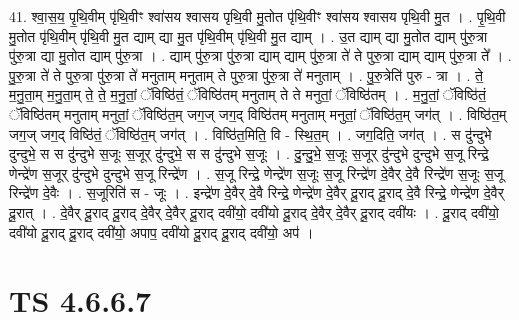 \documentclass[17pt]{extarticle}
\begin{document}
41. श्वा॒स॒य॒ पृ॒थि॒वीम् पृ॑थि॒वीꣳ श्वा॑सय श्वासय पृथि॒वी मु॒तोत पृ॑थि॒वीꣳ श्वा॑सय श्वासय पृथि॒वी मु॒त । . पृ॒थि॒वी मु॒तोत पृ॑थि॒वीम् पृ॑थि॒वी मु॒त द्याम् द्या मु॒त पृ॑थि॒वीम् पृ॑थि॒वी मु॒त द्याम् । . उ॒त द्याम् द्या मु॒तोत द्याम् पु॑रु॒त्रा पु॑रु॒त्रा द्या मु॒तोत द्याम् पु॑रु॒त्रा । . द्याम् पु॑रु॒त्रा पु॑रु॒त्रा द्याम् द्याम् पु॑रु॒त्रा ते॑ ते पुरु॒त्रा द्याम् द्याम् पु॑रु॒त्रा ते᳚ । . पु॒रु॒त्रा ते॑ ते पुरु॒त्रा पु॑रु॒त्रा ते॑ मनुताम् मनुताम् ते पुरु॒त्रा पु॑रु॒त्रा ते॑ मनुताम् । . पु॒रु॒त्रेति॑ पुरु - त्रा । . ते॒ म॒नु॒ता॒म् म॒नु॒ता॒म् ते॒ ते॒ म॒नु॒तां॒ ॅविष्ठि॑तं॒ ॅविष्ठि॑तम् मनुताम् ते ते मनुतां॒ ॅविष्ठि॑तम् । . म॒नु॒तां॒ ॅविष्ठि॑तं॒ ॅविष्ठि॑तम् मनुताम् मनुतां॒ ॅविष्ठि॑त॒म् जग॒ज् जग॒द् विष्ठि॑तम् मनुताम् मनुतां॒ ॅविष्ठि॑त॒म् जग॑त् । . विष्ठि॑त॒म् जग॒ज् जग॒द् विष्ठि॑तं॒ ॅविष्ठि॑त॒म् जग॑त् । . विष्ठि॑त॒मिति॒ वि - स्थि॒त॒म् । . जग॒दिति॒ जग॑त् । . स दु॑न्दुभे दुन्दुभे॒ स स दु॑न्दुभे स॒जूः स॒जूर् दु॑न्दुभे॒ स स दु॑न्दुभे स॒जूः । . दु॒न्दु॒भे॒ स॒जूः स॒जूर् दु॑न्दुभे दुन्दुभे स॒जू रिन्द्रे॒ णेन्द्रे॑ण स॒जूर् दु॑न्दुभे दुन्दुभे स॒जू रिन्द्रे॑ण । . स॒जू रिन्द्रे॒ णेन्द्रे॑ण स॒जूः स॒जू रिन्द्रे॑ण दे॒वैर् दे॒वै रिन्द्रे॑ण स॒जूः स॒जू रिन्द्रे॑ण दे॒वैः । . स॒जूरिति॑ स - जूः । . इन्द्रे॑ण दे॒वैर् दे॒वै रिन्द्रे॒ णेन्द्रे॑ण दे॒वैर् दू॒राद् दू॒राद् दे॒वै रिन्द्रे॒ णेन्द्रे॑ण दे॒वैर् दू॒रात् । . दे॒वैर् दू॒राद् दू॒राद् दे॒वैर् दे॒वैर् दू॒राद् दवी॑यो॒ दवी॑यो दू॒राद् दे॒वैर् दे॒वैर् दू॒राद् दवी॑यः । . दू॒राद् दवी॑यो॒ दवी॑यो दू॒राद् दू॒राद् दवी॑यो॒ अपाप॒ दवी॑यो दू॒राद् दू॒राद् दवी॑यो॒ अप॑ । \newline
\pagebreak
{}

\section{ TS 4.6.6.7 }
\end{document}
